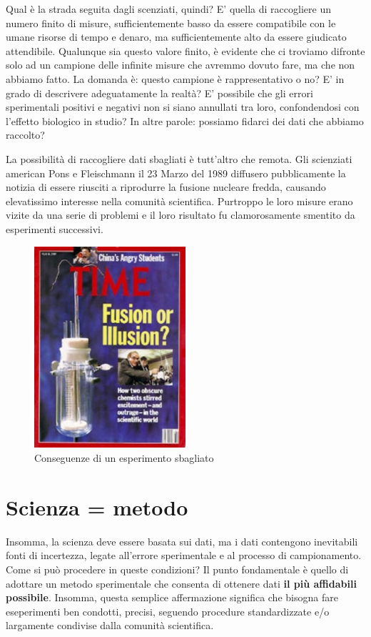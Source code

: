 \documentclass[a4paper,12pt,oneside]{book}
\begin{document}
Qual è la strada seguita dagli scenziati, quindi? E' quella di
raccogliere un numero finito di misure, sufficientemente basso da essere
compatibile con le umane risorse di tempo e denaro, ma sufficientemente
alto da essere giudicato attendibile. Qualunque sia questo valore
finito, è evidente che ci troviamo difronte solo ad un campione delle
infinite misure che avremmo dovuto fare, ma che non abbiamo fatto. La
domanda è: questo campione è rappresentativo o no? E' in grado di
descrivere adeguatamente la realtà? E' possibile che gli errori
sperimentali positivi e negativi non si siano annullati tra loro,
confondendosi con l'effetto biologico in studio? In altre parole:
possiamo fidarci dei dati che abbiamo raccolto?

La possibilità di raccogliere dati sbagliati è tutt'altro che remota.
Gli scienziati american Pons e Fleischmann il 23 Marzo del 1989
diffusero pubblicamente la notizia di essere riusciti a riprodurre la
fusione nucleare fredda, causando elevatissimo interesse nella comunità
scientifica. Purtroppo le loro misure erano vizite da una serie di
problemi e il loro risultato fu clamorosamente smentito da esperimenti
successivi.

\begin{figure}
\centering
\includegraphics[width=0.50000\textwidth]{_images/FalseResults.jpg}
\caption{Conseguenze di un esperimento sbagliato}
\end{figure}

\section{Scienza = metodo}\label{scienza-metodo}

Insomma, la scienza deve essere basata sui dati, ma i dati contengono
inevitabili fonti di incertezza, legate all'errore sperimentale e al
processo di campionamento. Come si può procedere in queste condizioni?
Il punto fondamentale è quello di adottare un metodo sperimentale che
consenta di ottenere dati \textbf{il più affidabili possibile}. Insomma,
questa semplice affermazione significa che bisogna fare eseperimenti ben
condotti, precisi, seguendo procedure standardizzate e/o largamente
condivise dalla comunità scientifica.
\end{document}
